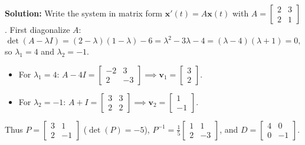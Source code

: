 \documentclass[11pt, letterpaper]{article}
\theoremstyle{definition}
\theoremstyle{remark}
\begin{document}
\textbf{Solution:}
Write the system in matrix form $\mathbf{x}'(t) = A\mathbf{x}(t)$ with $A = \begin{bmatrix} 2 & 3 \\ 2 & 1 \end{bmatrix}$. First diagonalize $A$:
\[
\det(A - \lambda I) = (2 - \lambda)(1 - \lambda) - 6 = \lambda^{2} - 3\lambda - 4 = (\lambda - 4)(\lambda + 1) = 0,
\]
so $\lambda_{1} = 4$ and $\lambda_{2} = -1$.
\begin{itemize}
    \item For $\lambda_{1} = 4$: $A - 4I = \begin{bmatrix} -2 & 3 \\ 2 & -3 \end{bmatrix} \implies \mathbf{v}_{1} = \begin{bmatrix} 3 \\ 2 \end{bmatrix}$.
    \item For $\lambda_{2} = -1$: $A + I = \begin{bmatrix} 3 & 3 \\ 2 & 2 \end{bmatrix} \implies \mathbf{v}_{2} = \begin{bmatrix} 1 \\ -1 \end{bmatrix}$.
\end{itemize}
Thus $P = \begin{bmatrix} 3 & 1 \\ 2 & -1 \end{bmatrix}$ ($\det(P) = -5$), $P^{-1} = \frac{1}{5}\begin{bmatrix} 1 & 1 \\ 2 & -3 \end{bmatrix}$, and $D = \begin{bmatrix} 4 & 0 \\ 0 & -1 \end{bmatrix}$.
\end{document}
